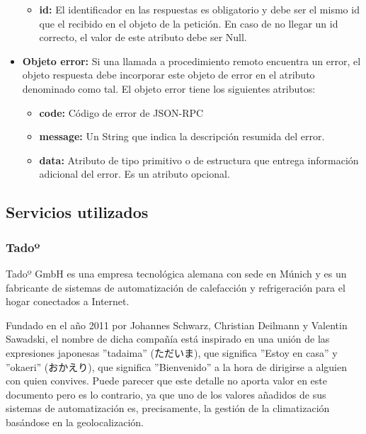 \documentclass[spanish,12pt, a4paper, twoside]{paper}
\begin{document}
\begin{itemize}
\begin{itemize}
\item \textbf{id:} El identificador en las respuestas es obligatorio y debe ser el mismo id que el recibido en el objeto de la petición. En caso de no llegar un id correcto, el valor de este atributo debe ser Null.
\end{itemize}

\item \textbf{Objeto error:} Si una llamada a procedimiento remoto encuentra un error, el objeto respuesta debe incorporar este objeto de error en el atributo denominado como tal. El objeto error tiene los siguientes atributos:

\begin{itemize}
\item \textbf{code:} Código de error de JSON-RPC

\item \textbf{message:} Un String que indica la descripción resumida del error.

\item \textbf{data:} Atributo de tipo primitivo o de estructura que entrega información adicional del error. Es un atributo opcional.
\end{itemize}

\end{itemize}

\subsection{Servicios utilizados}

\subsubsection{Tadoº}

Tadoº GmbH es una empresa tecnológica alemana con sede en Múnich y es un fabricante de sistemas de automatización de calefacción y refrigeración para el hogar conectados a Internet.
\newline

Fundado en el año 2011 por Johannes Schwarz, Christian Deilmann y Valentin Sawadski, el nombre de dicha compañía está inspirado en una unión de las expresiones japonesas ''tadaima'' (ただいま), que significa ''Estoy en casa'' y ''okaeri'' (おかえり), que significa ''Bienvenido'' a la hora de dirigirse a alguien con quien convives. 
Puede parecer que este detalle no aporta valor en este documento pero es lo contrario, ya que uno de los valores añadidos de sus sistemas de automatización es, precisamente, la gestión de la climatización basándose en la geolocalización.
\newline
\end{document}
